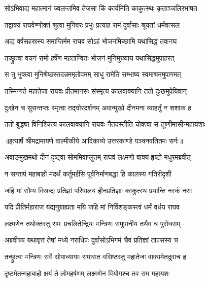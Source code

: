\twolineshloka
{सोऽभिवाद्य महात्मानं ज्वलन्तमिव तेजसा}
{किं कार्यमिति काकुत्स्थः कृताञ्जलिरभाषत} %

\twolineshloka
{तद्वाक्यं राघवेण्णोक्तं श्रुत्वा मुनिवरः प्रभुः}
{प्रत्याह रामं दुर्वासाः श्रूयतां धर्मवत्सल} %

\twolineshloka
{अद्य वर्षसहस्रस्य समाप्तिर्मम राघव}
{सोऽहं भोजनमिच्छामि यथासिद्धं तवानघ} %

\twolineshloka
{तच्छ्रुत्वा वचनं रामो हर्षेण महतान्वितः}
{भोजनं मुनिमुख्याय यथासिद्धमुपाहरत्} %

\twolineshloka
{स तु भुक्त्वा मुनिश्रेष्ठस्तदन्नममृतोपमम्}
{साधु रामेति सम्भाष्य स्वमाश्रममुपागमत्} %

\twolineshloka
{तस्मिन्गते महातेजा राघवः प्रीतमानसः}
{संस्मृत्य कालवाक्यानि ततो दुःखमुपेयिवान्} %

\twolineshloka
{दुःखेन च सुसन्तप्तः स्मृत्वा तद्घोरदर्शनम्}
{अवान्मुखो दीनमना व्याहर्तुं न शशाक ह} %

\twolineshloka
{ततो बुद्ध्या विनिश्चित्य कालवाक्यानि राघवः}
{नैतदस्तीति चोक्त्वा स तूष्णीमासीन्महायशाः} %


{॥इत्यार्षे श्रीमद्रामायणे वाल्मीकीये आदिकाव्ये उत्तरकाण्डे पञ्चनवतितमः सर्गः॥}


\twolineshloka
{अवाङ्मुखमथो दीनं दृष्ट्वा सोममिवाप्लुतम्}
{राघवं लक्ष्मणो वाक्यं हृष्टो मधुरमब्रवीत्} %

\twolineshloka
{न सन्तापं महाबाहो मदर्थं कर्तुमर्हसि}
{पूर्वनिर्माणबद्धा हि कालस्य गतिरीदृशी} %

\twolineshloka
{जहि मां सौम्य विस्रब्दः प्रतिज्ञां परिपालय}
{हीनप्रतिज्ञाः काकुत्स्थ प्रयान्ति नरकं नराः} %

\twolineshloka
{यदि प्रीतिर्महाराज यद्यनुग्राह्यता मयि}
{जहि मां निर्विशङ्कस्त्वं धर्मं वर्धय राघव} %

\twolineshloka
{लक्ष्मणेन तथोक्तस्तु रामः प्रचलितेन्द्रियः}
{मन्त्रिणः समुपानीय तथैव च पुरोधसम्} %

\twolineshloka
{अब्रवीच्च यथावृत्तं तेषां मध्ये नराधिपः}
{दुर्वासोऽभिगमं चैव प्रतिज्ञां तापसस्य च} %

\twolineshloka
{तच्छ्रुत्वा मन्त्रिणः सर्वे सोपाध्यायाः समासत}
{वसिष्ठस्तु महातेजा वाक्यमेतदुवाच ह} %

\twolineshloka
{दृष्टमेतन्महाबाहो क्षयं ते लोमहर्षणम्}
{लक्ष्मणेन वियोगश्च तव राम महायशः} %

